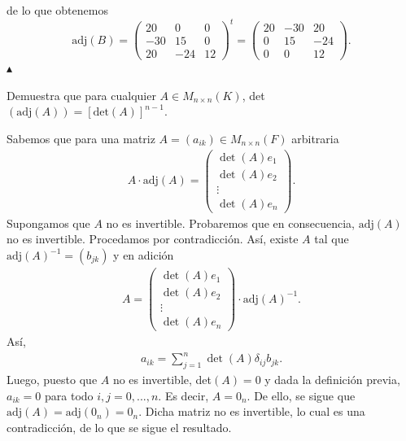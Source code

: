 \documentclass[11pt]{scrartcl}
\begin{document}
de lo que obtenemos
\begin{equation*}
    \text{adj}(B)=
    \begin{pmatrix}
        20 & 0 & 0 \\
        -30 & 15 & 0 \\
        20 & -24 & 12
    \end{pmatrix}^t=
    \begin{pmatrix}
        20 & -30 & 20 \\
        0 & 15 & -24 \\
        0 & 0 & 12
    \end{pmatrix}.
\end{equation*}
\hfill $\blacktriangle$

\newpage
\begin{mdframed}[style=mdpurplebox, frametitle={Ejercicio 6, Tarea 01, Álgebra Lineal II}]
    Demuestra que para cualquier $A\in M_{n\times n}(K)$, det$(\text{adj}(A))=\left[\text{det}(A)\right]^{n-1}$.
\end{mdframed}
Sabemos que para una matriz $A=(a_{ik})\in M_{n\times n}(F)$ arbitraria
\begin{align*}
    A\cdot \text{adj}(A) =
    \begin{pmatrix}
        \det(A)e_1 \\
        \det(A)e_2 \\
        \vdots \\
        \det(A)e_n
    \end{pmatrix}. \tag{1}
\end{align*}
Supongamos que $A$ no es invertible. Probaremos que en consecuencia, $\text{adj}(A)$ no es invertible. Procedamos por contradicción.
Así, existe $A$ tal que $\text{adj}(A)^{-1}=(b_{jk})$ y en adición
\begin{align*}
    A =
    \begin{pmatrix}
        \det(A)e_1 \\
        \det(A)e_2 \\
        \vdots \\
        \det(A)e_n
    \end{pmatrix}
    \cdot \text{adj}(A)^{-1}.
\end{align*}
Así,
\begin{align*}
    a_{ik}=\sum_{j=1}^{n}\det(A)\delta_{ij}b_{jk}.
\end{align*}
Luego, puesto que $A$ no es invertible, det$(A)=0$ y dada la definición previa, $a_{ik}=0$ para todo $i,j=0,...,n$. Es decir, $A=0_n$.
De ello, se sigue que $\text{adj}(A)=\text{adj}(0_n)=0_n$. Dicha matriz no es invertible, lo cual es una contradicción, de lo que se sigue el resultado. \\
\end{document}
